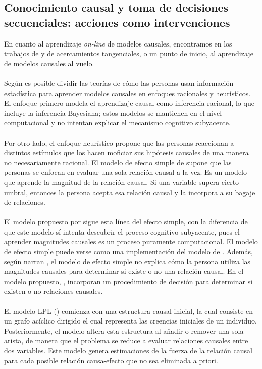 \documentclass[11pt]{article}
\theoremstyle{plain}
\begin{document}
\subsection{Conocimiento causal y toma de decisiones secuenciales: acciones como intervenciones}
En cuanto al aprendizaje \textit{on-line} de modelos causales, encontramos en los trabajos de \cite{wellen2012learning} y de \cite{kummerfeld2013tracking} acercamientos tangenciales, o un punto de inicio, al aprendizaje de modelos causales al vuelo.\\
\\
Según \cite{wellen2012learning} es posible dividir las teorías de cómo las personas usan información estadística para aprender modelos causales en enfoques racionales y heurísticos. El enfoque primero modela el aprendizaje causal como inferencia racional, lo que incluye la inferencia Bayesiana; estos modelos se mantienen en el nivel computacional y no intentan explicar el mecanismo cognitivo subyacente.\\
\\
Por otro lado, el enfoque heurístico propone que las personas reaccionan a distintos estímulos que los hacen moficiar sus hipótesis causales de una manera no necesariamente racional. El modelo de efecto simple de \cite{waldmann2008causal} supone que las personas se enfocan en evaluar una sola relación causal a la vez. Es un modelo que aprende la magnitud de la relación causal. Si una variable supera cierto umbral, entonces la persona acepta esa relación causal y la incorpora a su bagaje de relaciones.\\
\\
El modelo propuesto por \cite{wellen2012learning} sigue esta línea del efecto simple, con la diferencia de que este modelo sí intenta descubrir el proceso cognitivo subyacente, pues el aprender magnitudes causales es un proceso puramente computacional. El modelo de efecto simple puede verse como una implementación del modelo de \cite{danks2003dynamical}. Además, según narran \cite{wellen2012learning}, el modelo de efecto simple no explica cómo la persona utiliza las magnitudes causales para determinar si existe o no una relación causal. En el modelo propuesto, \cite{wellen2012learning}, incorporan un procedimiento de decisión para determinar si existen o no relaciones causales.\\
\\
El modelo LPL (\cite{wellen2012learning}) comienza con una estructura causal inicial, la cual consiste en un grafo acíclico dirigido el cual representa las creencias iniciales de un individuo. Posteriormente, el modelo altera esta estructura al añadir o remover una sola arista, de manera que el problema se reduce a evaluar relaciones causales entre dos variables. Este modelo genera estimaciones de la fuerza de la relación causal para cada posible relación causa-efecto que no sea eliminada a priori.\\
\end{document}
